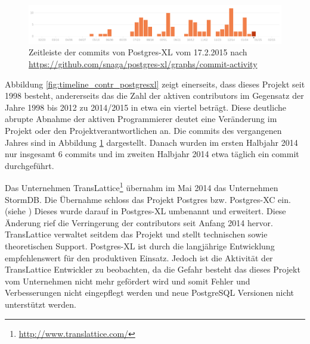 \begin{figure}[h!]
\centering
\includegraphics[width=\textwidth]{Abbildungen/postgresxl_timeline_commits.png}
\caption[Zeitleiste der commits von Postgres-XL]{Zeitleiste der commits von Postgres-XL vom 17.2.2015 nach \url{https://github.com/snaga/postgres-xl/graphs/commit-activity}}
\label{fig:timeline_commits_postgresxl}
\end{figure}
Abbildung \ref{fig:timeline_contr_postgresxl} zeigt einerseits, dass dieses Projekt seit 1998 besteht, andererseits das die Zahl der aktiven contributors im Gegensatz der Jahre 1998 bis 2012 zu 2014/2015 in etwa ein viertel beträgt.
Diese deutliche abrupte Abnahme der aktiven Programmierer deutet eine Veränderung im Projekt oder den Projektverantwortlichen an.
Die commits des vergangenen Jahres sind in Abbildung \ref{fig:timeline_commits_postgresxl} dargestellt.
Danach wurden im ersten Halbjahr 2014 nur insgesamt 6 commits und im zweiten Halbjahr 2014 etwa täglich ein commit durchgeführt.

Das Unternehmen TransLattice\footnote{\url{http://www.translattice.com/}} übernahm im Mai 2014 das Unternehmen StormDB.
Die Übernahme schloss das Projekt Postgres bzw. Postgres-XC ein. (siehe \cite{website:translattice-stormdb})
Dieses wurde darauf in Postgres-XL umbenannt und erweitert.
Diese Änderung rief die Verringerung der contributors seit Anfang 2014 hervor.
TransLattice verwaltet seitdem das Projekt und stellt technischen sowie theoretischen Support.
Postgres-XL ist durch die langjährige Entwicklung empfehlenswert für den produktiven Einsatz.
Jedoch ist die Aktivität der TransLattice Entwickler zu beobachten, da die Gefahr besteht das dieses Projekt vom Unternehmen nicht mehr gefördert wird und somit Fehler und Verbesserungen nicht eingepflegt werden und neue PostgreSQL Versionen nicht unterstützt werden.


